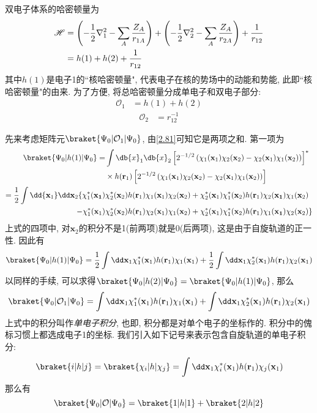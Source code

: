 双电子体系的哈密顿量为
\begin{align}
\mathscr{H}&=\left( -\frac{1}{2}\nabla_1^2 - \sum_A\frac{Z_A}{r_{1A}} \right) + \left( -\frac{1}{2}\nabla_2^2 - \sum_A\frac{Z_A}{r_{2A}} \right) + \frac{1}{r_{12}}\notag\\
&=h(1) + h(2) + \frac{1}{r_{12}}
\end{align}
其中$h(1)$是电子1的``核哈密顿量", 
代表电子在核的势场中的动能和势能, 
此即``核哈密顿量"的由来. 
为了方便, 
将总哈密顿量分成单电子和双电子部分:
\begin{align}
\mathcal{O}_1&=h(1)+h(2)
\label{2.81}
\end{align}
\begin{align}
\mathcal{O}_2&=r_{12}^{-1}
\end{align}

先来考虑矩阵元$\braket{\Psi_0|\mathcal{O}_1|\Psi_0}$, 
由\autoref{2.81}可知它是两项之和. 
第一项为
\begin{align}
\braket{\Psi_0|h(1)|\Psi_0}=&\int\db{x}_1\db{x}_2\left[2^{-1/2}\left(\chi_1(\mathbf{x}_1)\chi_2(\mathbf{x}_2)-\chi_2(\mathbf{x}_1)\chi_1(\mathbf{x}_2)\right)\right]^*\notag\\
\qquad&\times h(\mathbf{r}_1)\left[ 2^{-1/2}\left(\chi_1(\mathbf{x}_1)\chi_2(\mathbf{x}_2)-\chi_2(\mathbf{x}_1)\chi_1(\mathbf{x}_2)\right)\right]\notag\\
=\frac{1}{2}\int\dd{\mathbf{x}_1}\dd\mathbf{x}_2\{\chi_1^*(\mathbf{x_1})&\chi_2^*(\mathbf{x}_2)h(\mathbf{r}_1)\chi_1(\mathbf{x}_1)\chi_2(\mathbf{x}_2) + \chi_2^*(\mathbf{x}_1)\chi_1^*(\mathbf{x}_2)h(\mathbf{r}_1)\chi_2(\mathbf{x_1})\chi_1(\mathbf{x}_2) \notag\\
 - \chi_1^*(\mathbf{x}_1)&\chi_2^*(\mathbf{x}_2)h(\mathbf{r}_1)\chi_2(\mathbf{x}_1)\chi_1(\mathbf{x}_2) + \chi_2^*(\mathbf{x}_1)\chi_1^*(\mathbf{x}_2)h(\mathbf{r}_1)\chi_1(\mathbf{x_1})\chi_2(\mathbf{x}_2)
\}
\end{align}
上式的四项中, 
对$\mathbf{x}_2$的积分不是1(前两项)就是0(后两项), 
这是由于自旋轨道的正一性. 
因此有
\begin{equation}
\braket{\Psi_0|h(1)|\Psi_0}=\frac{1}{2}\int\dd\mathbf{x}_1\chi_1^*(\mathbf{x}_1)h(\mathbf{r}_1)\chi_1(\mathbf{x}_1)+\frac{1}{2}\int\dd\mathbf{x}_1\chi_2^*(\mathbf{x}_1)h(\mathbf{r}_1)\chi_2(\mathbf{x}_1)
\end{equation}
以同样的手续, 
可以求得$\braket{\Psi_0|h(2)|\Psi_0}=\braket{\Psi_0|h(1)|\Psi_0}$, 
那么
\begin{equation}
\braket{\Psi_0|\mathcal{O}_1|\Psi_0}=\int\dd\mathbf{x}_1\chi_1^*(\mathbf{x}_1)h(\mathbf{r}_1)\chi_1(\mathbf{x}_1) + \int\dd\mathbf{x}_1\chi_2^*(\mathbf{x}_1)h(\mathbf{r}_1)\chi_2(\mathbf{x}_1)
\end{equation}
上式中的积分叫作\emph{单电子积分}, 
也即, 
积分都是对单个电子的坐标作的. 
积分中的傀标习惯上都选成电子1的坐标. 
我们引入如下记号来表示包含自旋轨道的单电子积分:
\begin{equation}
\braket{i|h|j}=\braket{\chi_i|h|\chi_j}=\int\dd\mathbf{x}_1\chi_i^*(\mathbf{x}_1)h(\mathbf{r}_1)\chi_j(\mathbf{x}_1)
\end{equation}
那么有
\begin{equation}
\braket{\Psi_0|\mathcal{O}|\Psi_0}=\braket{1|h|1}+\braket{2|h|2}
\end{equation}

